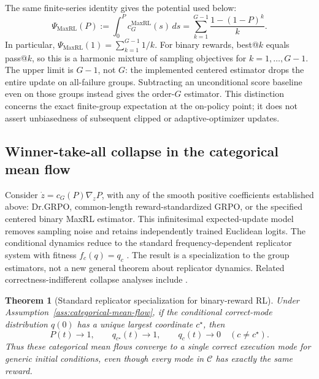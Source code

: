\documentclass{article}
\newcommand{\1}{\mathbf 1}
\newtheorem{theorem}[lemma]{Theorem}
\theoremstyle{remark}
\theoremstyle{definition}
\theoremstyle{plain}
\begin{document}
The same finite-series identity gives the potential used below:
\begin{equation}
 \Psi_{\mathrm{MaxRL}}(P)
 :=\int_0^P c_G^{\mathrm{MaxRL}}(s)\,ds
 =\sum_{k=1}^{G-1}\frac{1-(1-P)^k}{k}.
 \label{eq:maxrl-potential-finite-sum}
\end{equation}
In particular, $\Psi_{\mathrm{MaxRL}}(1)=\sum_{k=1}^{G-1}1/k$.
For binary rewards, best@\(k\) equals pass@\(k\), so this is a harmonic
mixture of sampling objectives for $k=1,\ldots,G-1$. The upper limit is
$G-1$, not $G$: the implemented centered estimator drops the entire update
on all-failure groups. Subtracting an unconditional score baseline even on
those groups instead gives the order-$G$ estimator. This distinction concerns
the exact finite-group expectation at the on-policy point; it does not assert
unbiasedness of subsequent clipped or adaptive-optimizer updates.


\subsection{Winner-take-all collapse in the categorical mean flow}
\label{app:theory-collapse}

Consider $\dot z=c_G(P)\nabla_zP$, with any of the smooth positive
coefficients established above: Dr.GRPO, common-length reward-standardized
GRPO, or the specified centered binary MaxRL estimator. This infinitesimal
expected-update model removes
sampling noise and retains independently trained Euclidean logits. The
conditional dynamics reduce to the standard frequency-dependent replicator
system with fitness $f_c(q)=q_c$ \citep{hofbauer1998evolutionary}. The result is
a specialization to the group estimators, not a new general theorem about
replicator dynamics. Related correctness-indifferent collapse analyses include
\citet{sinha2026expected,lochab2026ucpo}.

\begin{theorem}[Standard replicator specialization for binary-reward RL]
\label{thm:grpo-collapse}
Under Assumption~\ref{ass:categorical-mean-flow}, if the conditional correct-mode
distribution $q(0)$ has a unique largest coordinate $c^\star$, then
\[
  P(t)\longrightarrow1,
  \qquad
  q_{c^\star}(t)\longrightarrow1,
  \qquad
  q_c(t)\longrightarrow0\quad(c\ne c^\star).
\]
Thus these categorical mean flows converge to a single correct execution
mode for generic initial conditions, even though every mode in $\mathcal C$
has exactly the same reward.
\end{theorem}
\end{document}
